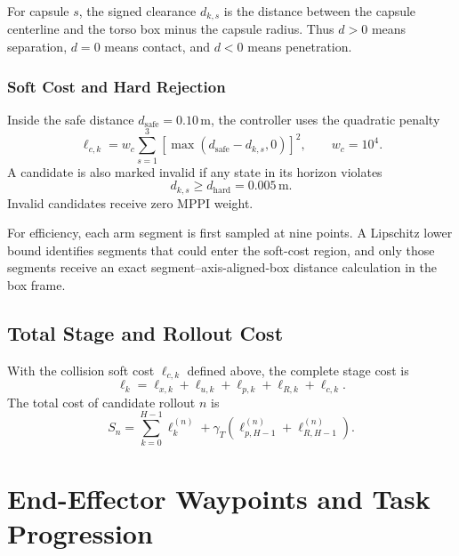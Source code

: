 \documentclass[11pt,a4paper]{article}
\begin{document}
For capsule $s$, the signed clearance $d_{k,s}$ is the distance between the
capsule centerline and the torso box minus the capsule radius. Thus $d>0$
means separation, $d=0$ means contact, and $d<0$ means penetration.

\subsubsection{Soft Cost and Hard Rejection}

Inside the safe distance $d_{\mathrm{safe}}=0.10\,\mathrm{m}$, the controller
uses the quadratic penalty
\begin{equation}
  \boxed{
  \ell_{c,k}=
  w_c\sum_{s=1}^{3}
  \left[
    \max(d_{\mathrm{safe}}-d_{k,s},0)
  \right]^2,
  \qquad w_c=10^4.
  }
\end{equation}
A candidate is also marked invalid if any state in its horizon violates
\begin{equation}
  d_{k,s}\geq d_{\mathrm{hard}}=0.005\,\mathrm{m}.
\end{equation}
Invalid candidates receive zero MPPI weight.

For efficiency, each arm segment is first sampled at nine points. A Lipschitz
lower bound identifies segments that could enter the soft-cost region, and
only those segments receive an exact segment--axis-aligned-box distance
calculation in the box frame.

\subsection{Total Stage and Rollout Cost}

With the collision soft cost $\ell_{c,k}$ defined above, the complete stage
cost is
\begin{equation}
  \ell_k=
  \ell_{x,k}+\ell_{u,k}+\ell_{p,k}+\ell_{R,k}+\ell_{c,k}.
\end{equation}
The total cost of candidate rollout $n$ is
\begin{equation}
  \boxed{
  S_n=
  \sum_{k=0}^{H-1}\ell_k^{(n)}
  +\gamma_T\left(
    \ell_{p,H-1}^{(n)}+\ell_{R,H-1}^{(n)}
  \right).
  }
\end{equation}

\section{End-Effector Waypoints and Task Progression}
\end{document}
